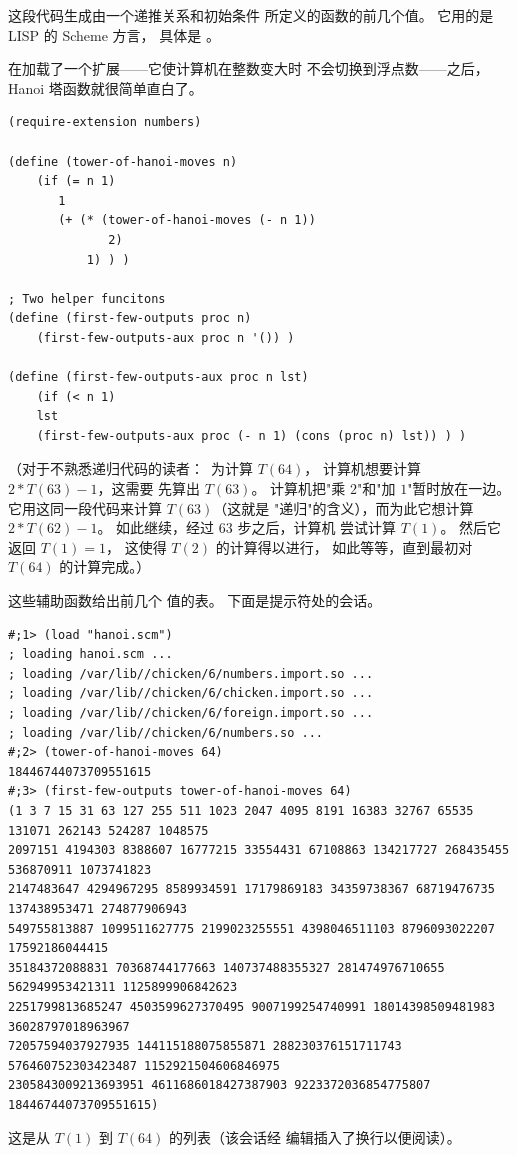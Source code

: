 \announcecomputercode
这段代码生成由一个递推关系和初始条件
所定义的函数的前几个值。
它用的是 LISP 的 Scheme 方言，
具体是 \cite{ChickenScheme}。

在加载了一个扩展——它使计算机在整数变大时
不会切换到浮点数——之后，
Hanoi 塔函数就很简单直白了。
\begin{lstlisting}
(require-extension numbers)

(define (tower-of-hanoi-moves n) 
    (if (= n 1)
       1
       (+ (* (tower-of-hanoi-moves (- n 1)) 
              2) 
           1) ) )

; Two helper funcitons
(define (first-few-outputs proc n)
    (first-few-outputs-aux proc n '()) )

(define (first-few-outputs-aux proc n lst)
    (if (< n 1)
    lst 
    (first-few-outputs-aux proc (- n 1) (cons (proc n) lst)) ) )
\end{lstlisting}
\noindent （对于不熟悉递归代码的读者：~为计算 $T(64)$，
计算机想要计算 $2*T(63)-1$，这需要
先算出 $T(63)$。
计算机把"乘 $2$"和"加 $1$"暂时放在一边。
它用这同一段代码来计算 $T(63)$（这就是
"递归"的含义），而为此它想计算 $2*T(62)-1$。
如此继续，经过 $63$ 步之后，计算机
尝试计算 $T(1)$。
然后它返回 $T(1)=1$，
这使得 $T(2)$ 的计算得以进行，
如此等等，直到最初对 $T(64)$ 的计算完成。）

这些辅助函数给出前几个
值的表。
下面是提示符处的会话。
\begin{lstlisting}
#;1> (load "hanoi.scm")
; loading hanoi.scm ...
; loading /var/lib//chicken/6/numbers.import.so ...
; loading /var/lib//chicken/6/chicken.import.so ...
; loading /var/lib//chicken/6/foreign.import.so ...
; loading /var/lib//chicken/6/numbers.so ...
#;2> (tower-of-hanoi-moves 64)
18446744073709551615
#;3> (first-few-outputs tower-of-hanoi-moves 64)
(1 3 7 15 31 63 127 255 511 1023 2047 4095 8191 16383 32767 65535 131071 262143 524287 1048575 
2097151 4194303 8388607 16777215 33554431 67108863 134217727 268435455 536870911 1073741823 
2147483647 4294967295 8589934591 17179869183 34359738367 68719476735 137438953471 274877906943 
549755813887 1099511627775 2199023255551 4398046511103 8796093022207 17592186044415 
35184372088831 70368744177663 140737488355327 281474976710655 562949953421311 1125899906842623 
2251799813685247 4503599627370495 9007199254740991 18014398509481983 36028797018963967 
72057594037927935 144115188075855871 288230376151711743 576460752303423487 1152921504606846975 
2305843009213693951 4611686018427387903 9223372036854775807 18446744073709551615)
\end{lstlisting}
\noindent 这是从 $T(1)$ 到 $T(64)$ 的列表（该会话经
编辑插入了换行以便阅读）。
\endinput
